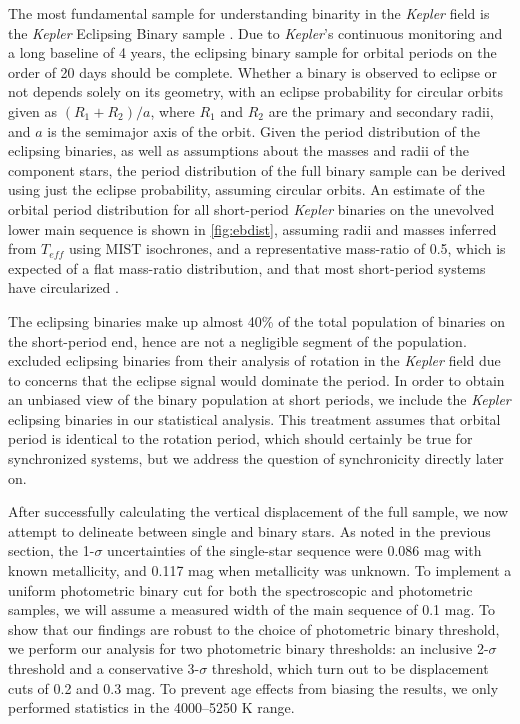 \documentclass[manuscript]{aastex6}
\newcommand{\Kepler}{\mbox{\textit{Kepler}}}
\newcommand{\Teff}{\ensuremath{T_{eff}}}
\begin{document}
The most fundamental sample for understanding binarity in the \Kepler{} field
is the \Kepler{} Eclipsing Binary sample \citep{Prsa11,Kirk16}. Due to
\Kepler{}'s continuous monitoring and a long baseline of 4 years, the eclipsing 
binary sample for orbital periods on the order of 20 days should be complete.
Whether a binary is observed to eclipse or not depends solely on its geometry,
with an eclipse probability for circular orbits given as \((R_1 + R_2)/a\), where \(R_1\) and 
\(R_2\) are the primary and secondary radii, and \(a\) is the semimajor axis of
the orbit. Given the period distribution of the eclipsing binaries, as well as
assumptions about the masses and radii of the component stars, the period
distribution of the full binary sample can be derived using just the eclipse
probability, assuming circular orbits. An estimate of the orbital period distribution for all
short-period \Kepler{} binaries on the unevolved lower main sequence is shown in 
\cref{fig:ebdist}, assuming radii and masses inferred from \Teff{} using MIST
isochrones, and a representative mass-ratio of 0.5, which is expected of a flat
mass-ratio distribution, and that most short-period systems have circularized
\citep{Raghavan10,VanEylen16}.

The eclipsing binaries make up almost 40\% of the total population of
binaries on the short-period end, hence are not a negligible segment of the
population. \citet{McQuillan14} excluded eclipsing binaries from their analysis
of rotation in the \Kepler{} field due to concerns that the eclipse signal would
dominate the period. In order to obtain an unbiased view of the binary
population at short periods, we include the \Kepler{} eclipsing binaries in our
statistical analysis. This treatment assumes that orbital period is identical
to the rotation period, which should certainly be true for synchronized
systems, but we address the question of synchronicity directly later on.

After successfully calculating the vertical displacement of the full sample, we
now attempt to delineate between single and binary stars. As noted in the
previous section, the 1-\(\sigma\) uncertainties of the single-star sequence 
were 0.086 mag with known metallicity, and 0.117 mag when metallicity was unknown. 
To implement a uniform photometric binary cut for both the spectroscopic and
photometric samples, we will assume a measured width of the main sequence of 
0.1 mag. To show that our findings are robust to the choice of photometric
binary threshold, we perform our analysis for two photometric binary thresholds: 
an inclusive 2-\(\sigma\) threshold and a conservative 3-\(\sigma\) threshold,
which turn out to be displacement cuts of 0.2 and 0.3 mag. To prevent age effects 
from biasing the results, we only performed statistics in the 4000--5250 K 
range.
\end{document}
